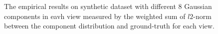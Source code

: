 \documentclass[11pt]{article}
\begin{document}
\begin{figure}
\caption{The empirical results on synthetic dataset with different 8 Gaussian components in eavh view measured by the weighted sum of $l2$-norm between the component distribution and ground-truth for each view.}
\end{figure}
\end{document}
